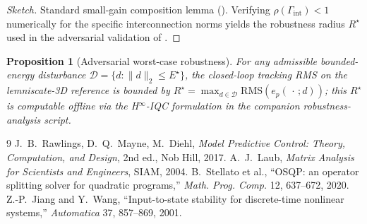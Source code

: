 \documentclass[11pt,a4paper]{article}
\theoremstyle{plain}
\newtheorem{proposition}[theorem]{Proposition}
\theoremstyle{definition}
\begin{document}
\begin{proof}[Sketch]
Standard small-gain composition lemma (\cite{JiangWangISS}).
Verifying $\rho(\Gamma_\mathrm{int})<1$ numerically for the specific
interconnection norms yields the robustness radius $R^\star$ used
in the adversarial validation of .
\end{proof}

\begin{proposition}[Adversarial worst-case robustness]\label{prop:adv}
For any admissible bounded-energy disturbance
$\mathcal D = \{d: \lVert d\rVert_2 \le E^\star\}$, the closed-loop
tracking RMS on the lemniscate-3D reference is bounded by
$R^\star = \max_{d\in\mathcal D}\mathrm{RMS}(e_p(\,\cdot\,;d))$;
this $R^\star$ is computable offline via the H$^\infty$-IQC
formulation in the companion robustness-analysis script.
\end{proposition}

\begin{thebibliography}{9}
J.~B.~Rawlings, D.~Q.~Mayne, M.~Diehl, \emph{Model Predictive
Control: Theory, Computation, and Design}, 2nd ed., Nob Hill, 2017.
A.~J.~Laub, \emph{Matrix Analysis for Scientists and Engineers},
SIAM, 2004.
B.~Stellato et al., ``OSQP: an operator splitting solver for
quadratic programs,'' \emph{Math. Prog. Comp.} 12, 637–672, 2020.
Z.-P.~Jiang and Y.~Wang, ``Input-to-state stability for
discrete-time nonlinear systems,'' \emph{Automatica} 37, 857–869,
2001.
\end{thebibliography}
\end{document}

